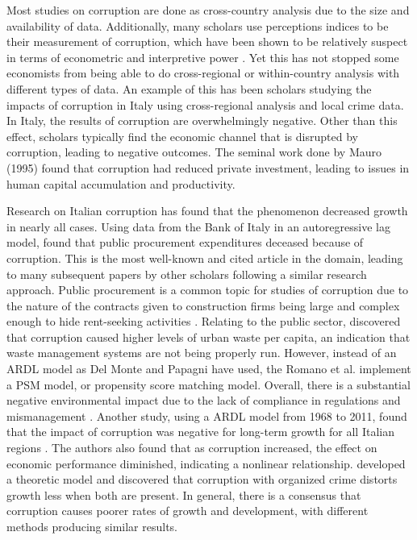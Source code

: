 \documentclass[12pt]{article} %
\begin{document}
Most studies on corruption are done as cross-country analysis due to the size and availability of data. Additionally, many scholars use perceptions indices to be their measurement of corruption, which have been shown to be relatively suspect in terms of econometric and interpretive power \citep{jahedi_advantages_2014, kong_chinas_2020}. Yet this has not stopped some economists from being able to do cross-regional or within-country analysis with different types of data. An example of this has been scholars studying the impacts of corruption in Italy using cross-regional analysis and local crime data. In Italy, the results of corruption are overwhelmingly negative. Other than this effect, scholars typically find the economic channel that is disrupted by corruption, leading to negative outcomes. The seminal work done by Mauro (1995) found that corruption had reduced private investment, leading to issues in human capital accumulation and productivity. 

Research on Italian corruption has found that the phenomenon decreased growth in nearly all cases. Using data from the Bank of Italy in an autoregressive lag model, \citet{del_monte_public_2001} found that public procurement expenditures deceased because of corruption. This is the most well-known and cited article in the domain, leading to many subsequent papers by other scholars following a similar research approach. Public procurement is a common topic for studies of corruption due to the nature of the contracts given to construction firms being large and complex enough to hide rent-seeking activities \citep{locatelli_corruption_2017-1}. Relating to the public sector, \citet{romano_environmental_2021} discovered that corruption caused higher levels of urban waste per capita, an indication that waste management systems are not being properly run. However, instead of an ARDL model as Del Monte and Papagni have used, the Romano et al. implement a PSM model, or propensity score matching model. Overall, there is a substantial negative environmental impact due to the lack of compliance in regulations and mismanagement \citep{bimonte_effect_2019}. Another study, using a ARDL model from 1968 to 2011, found that the impact of corruption was negative for long-term growth for all Italian regions \citep{lisciandra_economic_2016}. The authors also found that as corruption increased, the effect on economic performance diminished, indicating a nonlinear relationship. \citet{neanidis_empirical_2017} developed a theoretic model and discovered that corruption with organized crime distorts growth less when both are present. In general, there is a consensus that corruption causes poorer rates of growth and development, with different methods producing similar results. 
\end{document}
